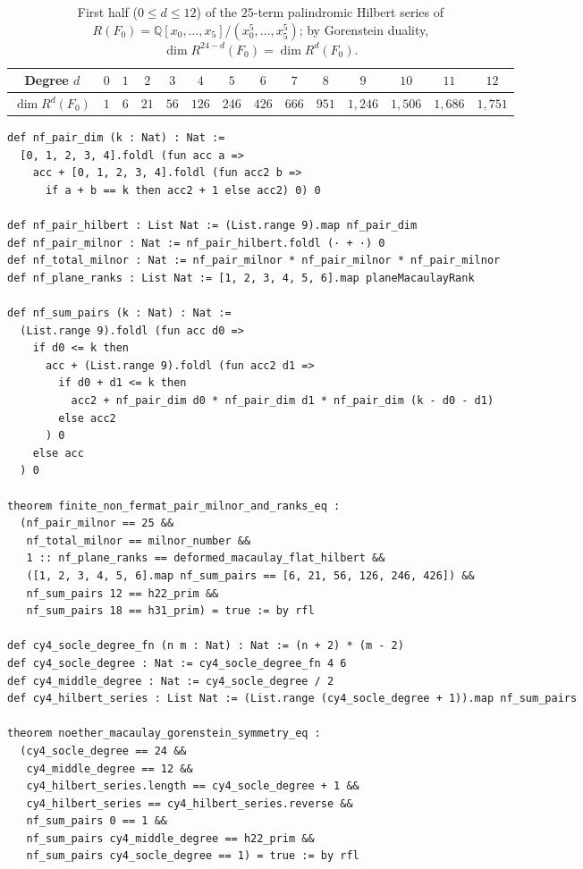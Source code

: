 \documentclass[11pt,a4paper]{article}
\begin{document}
\begin{table}[htbp]
  \centering
  \caption{First half ($0 \le d \le 12$) of the $25$-term palindromic Hilbert series of $R(F_0) = \mathbb{Q}[x_0,\dots,x_5]/(x_0^5,\dots,x_5^5)$; by Gorenstein duality, $\dim R^{24-d}(F_0) = \dim R^d(F_0)$.}
  \label{tab:hilbert_series}
  \begin{tabular}{cccccccccccccc}
    \toprule
    Degree $d$ & $0$ & $1$ & $2$ & $3$ & $4$ & $5$ & $6$ & $7$ & $8$ & $9$ & $10$ & $11$ & $12$ \\
    \midrule
    $\dim R^d(F_0)$ & $1$ & $6$ & $21$ & $56$ & $126$ & $246$ & $426$ & $666$ & $951$ & $1{,}246$ & $1{,}506$ & $1{,}686$ & $1{,}751$ \\
    \bottomrule
  \end{tabular}
\end{table}

\begin{lstlisting}[caption={Bivariate pair convolution, socle degree, and Gorenstein palindromic symmetry in \texttt{HodgeVerification.lean}.}]
def nf_pair_dim (k : Nat) : Nat :=
  [0, 1, 2, 3, 4].foldl (fun acc a =>
    acc + [0, 1, 2, 3, 4].foldl (fun acc2 b =>
      if a + b == k then acc2 + 1 else acc2) 0) 0

def nf_pair_hilbert : List Nat := (List.range 9).map nf_pair_dim
def nf_pair_milnor : Nat := nf_pair_hilbert.foldl (· + ·) 0
def nf_total_milnor : Nat := nf_pair_milnor * nf_pair_milnor * nf_pair_milnor
def nf_plane_ranks : List Nat := [1, 2, 3, 4, 5, 6].map planeMacaulayRank

def nf_sum_pairs (k : Nat) : Nat :=
  (List.range 9).foldl (fun acc d0 =>
    if d0 <= k then
      acc + (List.range 9).foldl (fun acc2 d1 =>
        if d0 + d1 <= k then
          acc2 + nf_pair_dim d0 * nf_pair_dim d1 * nf_pair_dim (k - d0 - d1)
        else acc2
      ) 0
    else acc
  ) 0

theorem finite_non_fermat_pair_milnor_and_ranks_eq :
  (nf_pair_milnor == 25 &&
   nf_total_milnor == milnor_number &&
   1 :: nf_plane_ranks == deformed_macaulay_flat_hilbert &&
   ([1, 2, 3, 4, 5, 6].map nf_sum_pairs == [6, 21, 56, 126, 246, 426]) &&
   nf_sum_pairs 12 == h22_prim &&
   nf_sum_pairs 18 == h31_prim) = true := by rfl

def cy4_socle_degree_fn (n m : Nat) : Nat := (n + 2) * (m - 2)
def cy4_socle_degree : Nat := cy4_socle_degree_fn 4 6
def cy4_middle_degree : Nat := cy4_socle_degree / 2
def cy4_hilbert_series : List Nat := (List.range (cy4_socle_degree + 1)).map nf_sum_pairs

theorem noether_macaulay_gorenstein_symmetry_eq :
  (cy4_socle_degree == 24 &&
   cy4_middle_degree == 12 &&
   cy4_hilbert_series.length == cy4_socle_degree + 1 &&
   cy4_hilbert_series == cy4_hilbert_series.reverse &&
   nf_sum_pairs 0 == 1 &&
   nf_sum_pairs cy4_middle_degree == h22_prim &&
   nf_sum_pairs cy4_socle_degree == 1) = true := by rfl
\end{lstlisting}
\end{document}
